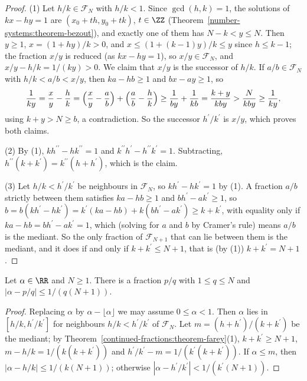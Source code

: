 \begin{proof}
(1) Let $h/k \in \mathcal{F}_N$ with $h/k < 1$. Since $\gcd(h, k) = 1$, the solutions of $kx - hy = 1$ are $(x_0 + th, y_0 + tk)$, $t \in \ZZ$ (Theorem~\ref{number-systems:theorem-bezout}), and
exactly one of them has $N - k < y \leq N$. Then $y \geq 1$, $x = (1 + hy)/k > 0$, and $x \leq (1 + (k - 1)y)/k \leq y$ since $h \leq k - 1$; the fraction $x/y$ is reduced (as $kx - hy = 1$), so
$x/y \in \mathcal{F}_N$, and $x/y - h/k = 1/(ky) > 0$. We claim that $x/y$ is the successor of $h/k$. If $a/b \in \mathcal{F}_N$ with $h/k < a/b < x/y$, then $ka - hb \geq 1$ and $bx - ay \geq 1$,
so
\[
\frac{1}{ky} = \frac xy - \frac hk = \Bigl(\frac xy - \frac ab\Bigr) + \Bigl(\frac ab - \frac hk\Bigr) \geq \frac{1}{by} + \frac{1}{kb} = \frac{k + y}{kby} > \frac{N}{kby} \geq \frac{1}{ky},
\]
using $k + y > N \geq b$, a contradiction. So the successor $h^{\prime}/k^{\prime}$ is $x/y$, which proves both claims.

(2) By (1), $kh^{\prime\prime} - hk^{\prime\prime} = 1$ and $k^{\prime\prime}h^{\prime} - h^{\prime\prime}k^{\prime} = 1$. Subtracting, $h^{\prime\prime}(k + k^{\prime}) = k^{\prime\prime}(h + h^{\prime})$, which is
the claim.

(3) Let $h/k < h^{\prime}/k^{\prime}$ be neighbours in $\mathcal{F}_N$, so $kh^{\prime} - hk^{\prime} = 1$ by (1). A fraction $a/b$ strictly between them satisfies $ka - hb \geq 1$ and
$bh^{\prime} - ak^{\prime} \geq 1$, so $b = b(kh^{\prime} - hk^{\prime}) = k^{\prime}(ka - hb) + k(bh^{\prime} - ak^{\prime}) \geq k + k^{\prime}$, with equality only if $ka - hb = bh^{\prime} - ak^{\prime} = 1$,
which (solving for $a$ and $b$ by Cramer's rule) means $a/b$ is the mediant. So the only fraction of $\mathcal{F}_{N+1}$ that can lie between them is the mediant, and it does if and only if
$k + k^{\prime} \leq N + 1$, that is (by (1)) $k + k^{\prime} = N + 1$.
\end{proof}

\begin{corollary}\label{continued-fractions:corollary-dirichlet-farey}
Let $\alpha \in \RR$ and $N \geq 1$. There is a fraction $p/q$ with $1 \leq q \leq N$ and $|\alpha - p/q| \leq 1/(q(N + 1))$.
\end{corollary}

\begin{proof}
Replacing $\alpha$ by $\alpha - \lfloor\alpha\rfloor$ we may assume $0 \leq \alpha < 1$. Then $\alpha$ lies in $[h/k, h^{\prime}/k^{\prime}]$ for neighbours $h/k < h^{\prime}/k^{\prime}$ of
$\mathcal{F}_N$. Let $m = (h + h^{\prime})/(k + k^{\prime})$ be the mediant; by Theorem~\ref{continued-fractions:theorem-farey}(1), $k + k^{\prime} \geq N + 1$, $m - h/k = 1/(k(k + k^{\prime}))$ and
$h^{\prime}/k^{\prime} - m = 1/(k^{\prime}(k + k^{\prime}))$. If $\alpha \leq m$, then $|\alpha - h/k| \leq 1/(k(N + 1))$; otherwise $|\alpha - h^{\prime}/k^{\prime}| < 1/(k^{\prime}(N + 1))$.
\end{proof}

